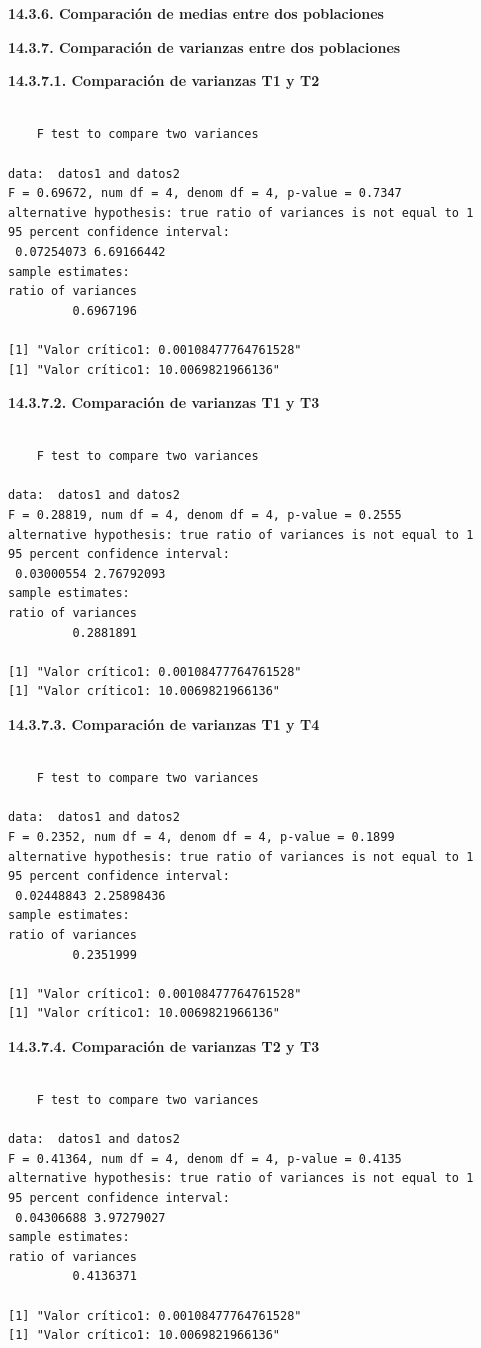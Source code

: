 \documentclass[
  letterpaper,
  DIV=11,
  numbers=noendperiod]{scrartcl}
\begin{document}
\textbf{14.3.6. Comparación de medias entre dos poblaciones}

\textbf{14.3.7. Comparación de varianzas entre dos poblaciones}

\textbf{14.3.7.1. Comparación de varianzas T1 y T2}

\begin{verbatim}

    F test to compare two variances

data:  datos1 and datos2
F = 0.69672, num df = 4, denom df = 4, p-value = 0.7347
alternative hypothesis: true ratio of variances is not equal to 1
95 percent confidence interval:
 0.07254073 6.69166442
sample estimates:
ratio of variances 
         0.6967196 

[1] "Valor crítico1: 0.00108477764761528"
[1] "Valor crítico1: 10.0069821966136"
\end{verbatim}

\textbf{14.3.7.2. Comparación de varianzas T1 y T3}

\begin{verbatim}

    F test to compare two variances

data:  datos1 and datos2
F = 0.28819, num df = 4, denom df = 4, p-value = 0.2555
alternative hypothesis: true ratio of variances is not equal to 1
95 percent confidence interval:
 0.03000554 2.76792093
sample estimates:
ratio of variances 
         0.2881891 

[1] "Valor crítico1: 0.00108477764761528"
[1] "Valor crítico1: 10.0069821966136"
\end{verbatim}

\textbf{14.3.7.3. Comparación de varianzas T1 y T4}

\begin{verbatim}

    F test to compare two variances

data:  datos1 and datos2
F = 0.2352, num df = 4, denom df = 4, p-value = 0.1899
alternative hypothesis: true ratio of variances is not equal to 1
95 percent confidence interval:
 0.02448843 2.25898436
sample estimates:
ratio of variances 
         0.2351999 

[1] "Valor crítico1: 0.00108477764761528"
[1] "Valor crítico1: 10.0069821966136"
\end{verbatim}

\textbf{14.3.7.4. Comparación de varianzas T2 y T3}

\begin{verbatim}

    F test to compare two variances

data:  datos1 and datos2
F = 0.41364, num df = 4, denom df = 4, p-value = 0.4135
alternative hypothesis: true ratio of variances is not equal to 1
95 percent confidence interval:
 0.04306688 3.97279027
sample estimates:
ratio of variances 
         0.4136371 

[1] "Valor crítico1: 0.00108477764761528"
[1] "Valor crítico1: 10.0069821966136"
\end{verbatim}
\end{document}

